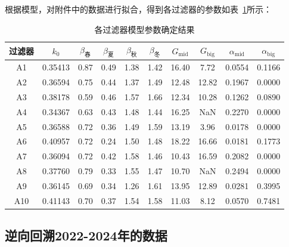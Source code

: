 \documentclass[withoutpreface,bwprint]{cumcmthesis}
\begin{document}
根据模型，对附件中的数据进行拟合，得到各过滤器的参数如表~\ref{tab:参数确定}所示：
\begin{table}[H]
	\centering
	\setlength{\tabcolsep}{4pt}
	\renewcommand{\arraystretch}{1.5}
	\setlength{\tabcolsep}{10pt}
	\caption{各过滤器模型参数确定结果}
	\label{tab:参数确定}
	\begin{tabular}{cccccccccc}
		\toprule
		\textbf{过滤器} & \textbf{$k_0$} & \textbf{$\beta_{\text{春}}$} & \textbf{$\beta_{\text{夏}}$} & \textbf{$\beta_{\text{秋}}$} & \textbf{$\beta_{\text{冬}}$} & \textbf{$G_{\text{mid}}$} & \textbf{$G_{\text{big}}$} & \textbf{$\alpha_{\text{mid}}$} & \textbf{$\alpha_{\text{big}}$} \\
		\midrule
		\rowcolor{LightBlue}
		A1 & 0.35413 & 0.87 & 0.49 & 1.38 & 1.42 & 16.40 & 7.72 & 0.0554 & 0.1166 \\
		A2 & 0.36594 & 0.75 & 0.44 & 1.37 & 1.49 & 12.48 & 12.82 & 0.1967 & 0.0000 \\
		\rowcolor{LightBlue}
		A3 & 0.38178 & 0.59 & 0.46 & 1.57 & 1.66 & 12.34 & 10.28 & 0.1262 & 0.0890 \\
		A4 & 0.34367 & 0.63 & 0.43 & 1.48 & 1.44 & 16.25 & NaN & 0.2270 & 0.0000 \\
		\rowcolor{LightBlue}
		A5 & 0.36588 & 0.72 & 0.36 & 1.49 & 1.59 & 13.19 & 3.96 & 0.0178 & 0.0000 \\
		A6 & 0.40957 & 0.72 & 0.24 & 1.50 & 1.48 & 18.22 & 16.66 & 0.0181 & 0.1773 \\
		\rowcolor{LightBlue}
		A7 & 0.36094 & 0.72 & 0.42 & 1.58 & 1.46 & 10.43 & 16.59 & 0.2082 & 0.0000 \\
		A8 & 0.37760 & 0.79 & 0.33 & 1.55 & 1.47 & 10.70 & NaN & 0.2494 & 0.0000 \\
		\rowcolor{LightBlue}
		A9 & 0.36145 & 0.69 & 0.34 & 1.26 & 1.61 & 13.95 & 12.89 & 0.0281 & 0.3995 \\
		A10 & 0.41143 & 0.70 & 0.37 & 1.54 & 1.58 & 11.03 & 8.12 & 0.0570 & 0.7481 \\
		\bottomrule
	\end{tabular}
\end{table}

\subsection{逆向回溯2022-2024年的数据}
\end{document}

